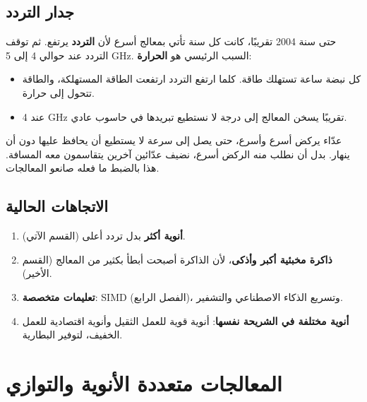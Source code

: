 \subsection{جدار التردد}
حتى سنة 2004 تقريبًا، كانت كل سنة تأتي بمعالج أسرع لأن \textbf{التردد} يرتفع. ثم توقف التردد عند حوالي
\textenglish{4} إلى \textenglish{5 GHz}. السبب الرئيسي هو \textbf{الحرارة}:
\begin{itemize}
    \item كل نبضة ساعة تستهلك طاقة. كلما ارتفع التردد ارتفعت الطاقة المستهلكة، والطاقة تتحول إلى حرارة.
    \item عند \textenglish{4 GHz} تقريبًا يسخن المعالج إلى درجة لا نستطيع تبريدها في حاسوب عادي.
\end{itemize}

\begin{tashbih}
    عدّاء يركض أسرع وأسرع، حتى يصل إلى سرعة لا يستطيع أن يحافظ عليها دون أن ينهار. بدل أن نطلب منه
    الركض أسرع، نضيف عدّائين آخرين يتقاسمون معه المسافة. هذا بالضبط ما فعله صانعو المعالجات.
\end{tashbih}

\subsection{الاتجاهات الحالية}
\begin{enumerate}
    \item \textbf{أنوية أكثر} بدل تردد أعلى (القسم الآتي).
    \item \textbf{ذاكرة مخبئية أكبر وأذكى}، لأن الذاكرة أصبحت أبطأ بكثير من المعالج (القسم الأخير).
    \item \textbf{تعليمات متخصصة}: \textenglish{SIMD} (الفصل الرابع)، وتسريع الذكاء الاصطناعي والتشفير.
    \item \textbf{أنوية مختلفة في الشريحة نفسها}: أنوية قوية للعمل الثقيل وأنوية اقتصادية للعمل الخفيف، لتوفير البطارية.
\end{enumerate}

\section{المعالجات متعددة الأنوية والتوازي}

